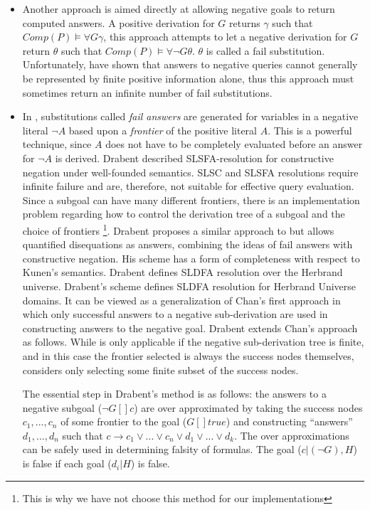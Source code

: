\documentclass{tlp}
\newcommand{\where}{[\!]} %
\begin{document}
\begin{itemize}
\item Another approach \cite{Malus} is aimed directly at allowing
negative goals to return computed answers. A positive derivation for
$G$ returns $\gamma$ such that $Comp(P) \models \forall G \gamma$,
this approach attempts to let a negative derivation for $G$ return
$\theta$ such that $Comp(P) \models \forall \neg G \theta$. $\theta$
is called a fail substitution. Unfortunately, \cite{Lassez} have shown
that answers to negative queries cannot generally be represented by
finite positive information alone, thus this approach must sometimes
return an infinite number of fail substitutions.

\item In \cite{Drabent,Fages,Malus}, substitutions called \emph{fail
answers} are generated for variables in a negative literal $\neg A$
based upon a \emph{frontier} of the positive literal $A$. This is a
powerful technique, since $A$ does not have to be completely evaluated
before an answer for $\neg A$ is derived. Drabent \cite{Drabent}
described SLSFA-resolution for constructive negation under
well-founded semantics. SLSC and SLSFA resolutions require infinite
failure and are, therefore, not suitable for effective query
evaluation.  Since a subgoal can have many different frontiers, there
is an implementation problem regarding how to control the derivation
tree of a subgoal and the choice of frontiers \footnote{This is why
we have not choose this method for our implementations}. Drabent
proposes a similar approach to \cite{Malus} but allows quantified
disequations as answers, combining the ideas of fail answers with
constructive negation. His scheme has a form of completeness with
respect to Kunen's semantics. Drabent defines SLDFA resolution over
the Herbrand universe.
Drabent's scheme \cite{Drabent} defines SLDFA resolution for Herbrand
Universe domains. It can be viewed as a generalization of Chan's first
approach \cite{Chan1} in which only successful answers to a negative
sub-derivation are used in constructing answers to the negative
goal. Drabent extends Chan's approach as follows. While
\cite{Chan1} is only applicable if the negative sub-derivation tree is
finite, and in this case the frontier selected is always the success
nodes themselves, \cite{Drabent} considers only selecting some finite
subset of the success nodes.

The essential step in Drabent's method is as follows: the answers to a
negative subgoal ($\neg G \where c$) are over approximated by taking
the success nodes $c_1, ..., c_n$ of some frontier to the goal ($G
\where true$) and constructing ``answers'' $d_1, ..., d_n$ such that
$c \rightarrow c_1 \vee ... \vee c_n \vee d_1 \vee ... \vee d_k$. The
over approximations can be safely used in determining falsity of
formulas. The goal ($c | (\neg G), H$) is false if each goal ($d_i |
H$) is false.


\end{itemize}
\end{document}
